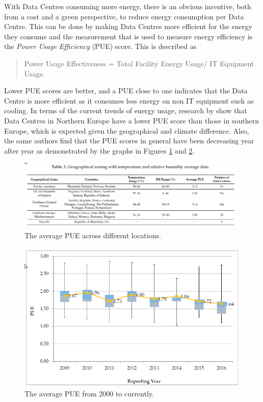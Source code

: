 \documentclass[12pt]{scrartcl}
\begin{document}
With Data Centres consuming more energy, there is an obvious incentive, both from a cost and a green perspective, to reduce energy consumption per Data Centre. This can be done by making Data Centres more efficient for the energy they consume and the measurement that is used to measure energy efficiency is the \emph{Power Usage Efficiency} (PUE) score. This is described as

\begin{quotation} 
Power Usage Effectiveness = Total Facility Energy Usage/ IT Equipment Usage.
\end{quotation}

Lower PUE scores are better, and a PUE close to one indicates that the Data Centre is more efficient as it consumes less energy on non IT equipment such as cooling. 
In terms of the current trends of energy usage, research by \citet{edsbas.13818AC20170101} show that Data Centres in Northern Europe have a lower PUE score than those in southern Europe, which is expected given the geographical and climate difference. Also, the same authors find that the PUE scores in general have been decreasing year after year as demonstrated by the graphs in Figures \ref{fig:PUE-by-location} and \ref{fig:PUE-by-year}.

\begin{figure}[h]
  \caption{The average PUE across different locations.}
  \label{fig:PUE-by-location}
  \centering
    \includegraphics[scale=0.45]{geographical_zoning.png}
\end{figure}

\begin{figure}[h]
  \caption{The average PUE from 2000 to currently.}
  \label{fig:PUE-by-year}
  \centering
    \includegraphics[scale=0.35]{Average_PUE_per_reporting_year.png}
\end{figure}
 
\end{document}
